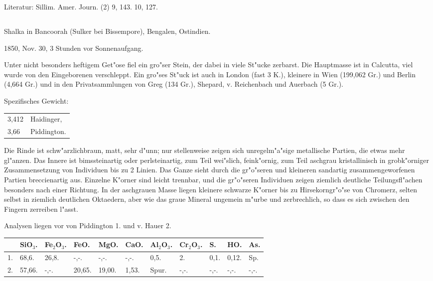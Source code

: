 \documentclass[a4paper, 11pt, oneside]{article}
\begin{document}
\normalsize
Literatur: Sillim. Amer. Journ. (2) 9, 143. 10, 127.

\subsection{}
\LARGE
\paragraph{}
Shalka in Bancoorah (Sulker bei Bissempore), Bengalen, Ostindien.

1850, Nov. 30, 3 Stunden vor Sonnenaufgang.

Unter nicht besonders heftigem Get"ose fiel ein gro"ser Stein, der dabei in viele St"ucke zerbarst. Die Hauptmasse ist in Calcutta, viel wurde von den Eingeborenen verschleppt. Ein gro"ses St"uck ist auch in London (fast 3 K.), kleinere in Wien (199,062 Gr.) und Berlin (4,664 Gr.) und in den Privatsammlungen von Greg (134 Gr.), Shepard, v. Reichenbach und Auerbach (5 Gr.).

Spezifisches Gewicht:  
\begin{table}[!ht]
    \centering\swabfamily\Large
    \begin{tabular}{l l}
        3,412 & Haidinger,\\
        3,66 & Piddington.
    \end{tabular}
\end{table}

Die Rinde ist schw"arzlichbraun, matt, sehr d"unn; nur stellenweise zeigen sich unregelm"a"sige metallische Partien, die etwas mehr gl"anzen. Das Innere ist bimssteinartig oder perlsteinartig, zum Teil wei"slich, feink"ornig, zum Teil aschgrau kristallinisch in grobk"orniger Zusammensetzung von Individuen bis zu 2 Linien. Das Ganze sieht durch die gr"o"seren und kleineren sandartig zusammengeworfenen Partien breccienartig aus. Einzelne K"orner sind leicht trennbar, und die gr"o"seren Individuen zeigen ziemlich deutliche Teilungsfl"achen besonders nach einer Richtung. In der aschgrauen Masse liegen kleinere schwarze K"orner bis zu Hirsekorngr"o"se von Chromerz, selten selbst in ziemlich deutlichen Oktaedern, aber wie das graue Mineral ungemein m"urbe und zerbrechlich, so dass es sich zwischen den Fingern zerreiben l"asst.

Analysen liegen vor von Piddington 1. und v. Hauer 2.
\begin{table}[!ht]
    \centering\swabfamily\Large
    \normalsize
    \begin{tabular}{l l l l l l l l l l l}
         & SiO$_{3}$. & Fe$_{2}$O$_{3}$. & FeO. & MgO. & CaO. & Al$_{2}$O$_{3}$. & Cr$_{2}$O$_{3}$. & S. & HO. & As. \\ \hline
        1. & 68,6. & 26,8. & -,-. & -,-. & -,-. & 0,5. & 2. & 0,1. & 0,12. & Sp. \\
        2. & 57,66. & -,-. & 20,65. & 19,00. & 1,53. & Spur. & -,-. & -,-. & -,-. & -,-. \\
    \end{tabular}
\end{table}
\end{document}
